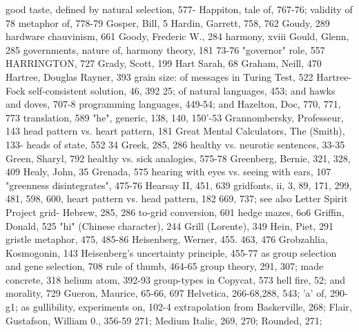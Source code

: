 good taste, defined by natural selection, 577-    Happiton, tale of, 767-76; validity of
 78                                                metaphor of, 778-79
Gosper, Bill, 5                                   Hardin, Garrett, 758, 762
Goudy, 289                                        hardware chauvinism, 661
Goody, Frederic W., 284                           harmony, xviii
Gould, Glenn, 285 governments, nature of,         harmony theory, 181
 73-76 "governor" role, 557                       HARRINGTON, 727
Grady, Scott, 199                                 Hart Sarah, 68
Graham, Neill, 470                                Hartree, Douglas Rayner, 393
grain size: of messages in Turing Test, 522       Hartree-Fock self-consistent solution, 46, 392
 25; of natural languages, 453; and                hawks and doves, 707-8
 programming languages, 449-54; and               Hazelton, Doc, 770, 771, 773
 translation, 589                                 "he", generic, 138, 140, 150'-53
Grannombersky, Professeur, 143                    head pattern vs. heart pattern, 181
Great Mental Calculators, The (Smith), 133-       heads of state, 552
 34 Greek, 285, 286                               healthy vs. neurotic sentences, 33-35
Green, Sharyl, 792                                healthy vs. sick analogies, 575-78
Greenberg, Bernie, 321, 328, 409                  Healy, John, 35
Grenada, 575                                      hearing with eyes vs. seeing with ears, 107
"greenness disintegrates", 475-76                 Hearsay II, 451, 639
gridfonts, ii, 3, 89, 171, 299, 481, 598, 600,    heart pattern vs. head pattern, 182
 669, 737; see also Letter Spirit Project grid-   Hebrew, 285, 286
 to-grid conversion, 601                          hedge mazes, 6o6
Griffin, Donald, 525                              "hi" (Chinese character), 244
Grill (Lorente), 349                              Hein, Piet, 291
gristle metaphor, 475, 485-86                     Heisenberg, Werner, 455. 463, 476
Grobzahlia, Kosmogonin, 143                       Heisenberg's uncertainty principle, 455-77 as
group selection and gene selection, 708            rule of thumb, 464-65
group theory, 291, 307; made concrete, 318        helium atom, 392-93
group-types in Copycat, 573                       hell fire, 52; and morality, 729
Gueron, Maurice, 65-66, 697                       Helvetica, 266-68,288, 543; 'a' of, 290-g1; as
gullibility, experiments on, 102-4                 extrapolation from Baskerville, 268; Flair,
Gustafson, William 0., 356-59                      271; Medium Italic, 269, 270; Rounded, 271;
